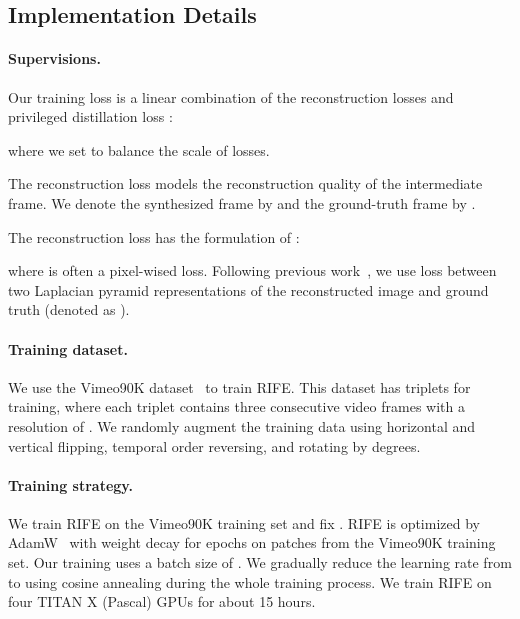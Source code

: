 \documentclass[final]{cvpr}
\begin{document}
\subsection{Implementation Details}
\label{subsec:implement}

\paragraph{Supervisions.} Our training loss  is a linear combination of the reconstruction losses  and privileged distillation loss :  

where we set  to balance the scale of losses.

The reconstruction loss  models the reconstruction quality of the intermediate frame. We denote the synthesized frame by  and the ground-truth frame by .


The reconstruction loss has the formulation of :

where  is often a pixel-wised loss. Following previous work~\cite{niklaus2018context, niklaus2020softmax}, we use  loss between two Laplacian pyramid representations of the reconstructed image and ground truth (denoted as ).




\paragraph{Training dataset.}
We use the Vimeo90K dataset~\cite{xue2019video} to train RIFE. This dataset has  triplets for training, where each triplet contains three consecutive video frames with a resolution of . We randomly augment the training data using horizontal and vertical flipping, temporal order reversing, and rotating by  degrees.

\paragraph{Training strategy.}
We train RIFE on the Vimeo90K training set and fix . RIFE is optimized by AdamW~\cite{loshchilov2018fixing} with weight decay  for  epochs on  patches from the Vimeo90K training set. Our training uses a batch size of . We gradually reduce the learning rate from  to  using cosine annealing during the whole training process. We train RIFE on four TITAN X (Pascal) GPUs for about 15 hours. 
\end{document}
